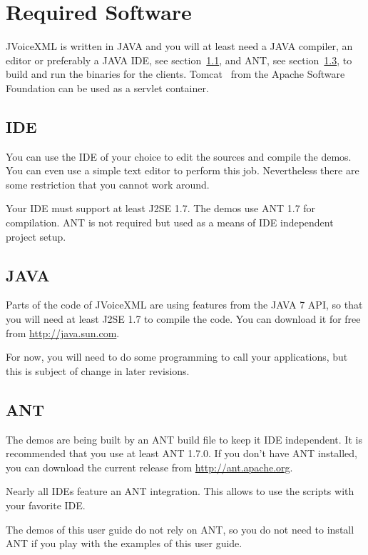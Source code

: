 \documentclass[11pt,a4paper]{book}
\begin{document}
\section{Required Software}
\label{sec:required-software}

JVoiceXML is written in JAVA and you will at least need a JAVA compiler, an 
editor or preferably a JAVA IDE, see section~\ref{sec:ide}, and ANT, see 
section~\ref{sec:ant}, to build and run the binaries for the 
clients. Tomcat~\cite{apache:tomcat} from the Apache Software Foundation can be
used as a servlet container.

\subsection{IDE}
\label{sec:ide}

You can use the IDE of your choice to edit the sources and compile the 
demos. You can even use a simple text editor to perform this job.
Nevertheless there are some restriction that you cannot work around.

Your IDE must support at least J2SE 1.7. The demos use ANT 1.7 for compilation. 
ANT is not required but used as a means of IDE independent project setup.

\subsection{JAVA}
\label{sec:java}

Parts of the code of JVoiceXML are using features from the JAVA 7 API, so that
you will need at least J2SE 1.7 to compile the code. You can download it
for free from \url{http://java.sun.com}.

For now, you will need to do some programming to call your applications, but
this is subject of change in later revisions.

\subsection{ANT}
\label{sec:ant}

The demos are being built by an ANT build file to keep it IDE independent. It is
recommended that you use at least ANT 1.7.0. 
If you don't have ANT installed, you can download the current release
from \url{http://ant.apache.org}.

Nearly all IDEs feature an ANT integration. This allows to use the scripts with
your favorite IDE.

The demos of this user guide do not rely on ANT, so you do not need to install
ANT if you play with the examples of this user guide.
\end{document}
